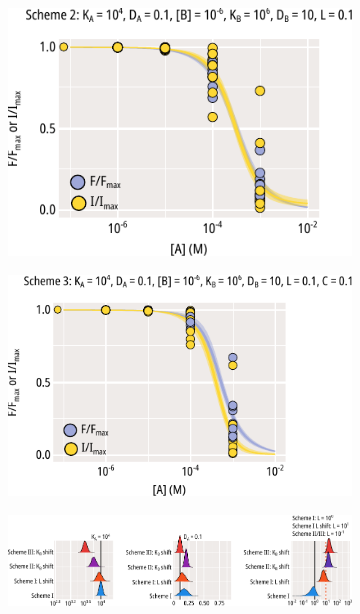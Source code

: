 \begin{figure}[hbtp]
	\centering
	\begin{subfigure}[t]{0.45\textwidth}
		\caption{}\label{ch4fig:scheme_2_kb_shift}
		\centering
		\includegraphics[width=\textwidth]{mwc_scheme_2_kb_shift.pdf}
	\end{subfigure}
	\hfill
	\begin{subfigure}[t]{0.45\textwidth}
		\caption{}\label{ch4fig:scheme_3_kb_shift}
		\centering
		\includegraphics[width=\textwidth]{mwc_scheme_3_kb_shift.pdf}
	\end{subfigure}
	\vfill
	\begin{subfigure}[t]{0.9\textwidth}
		\caption{}\label{ch4fig:mwc_params_3}
		\centering
		\includegraphics[width=\textwidth]{mwc_scheme_param_fits_3.pdf}

\end{subfigure}
\end{figure}
